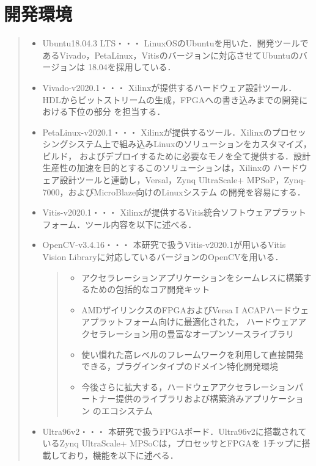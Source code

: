 \documentclass[11pt,a4j]{jreport}
\begin{document}
\section{開発環境}
\begin{quote}
  \begin{itemize}
    \item Ubuntu18.04.3 LTS・・・
    LinuxOSのUbuntuを用いた．開発ツールであるVivado，PetaLinux，Vitisのバージョンに対応させてUbuntuのバージョンは
    18.04を採用している．
    \item Vivado-v2020.1・・・
    Xilinxが提供するハードウェア設計ツール．HDLからビットストリームの生成，FPGAへの書き込みまでの開発における下位の部分
    を担当する．
    \item PetaLinux-v2020.1・・・
    Xilinxが提供するツール．Xilinxのプロセッシングシステム上で組み込みLinuxのソリューションをカスタマイズ，ビルド，
    およびデプロイするために必要なモノを全て提供する．設計生産性の加速を目的とするこのソリューションは，Xilinxの
    ハードウェア設計ツールと連動し，Versal，Zynq UltraScale+ MPSoP，Zynq-7000，およびMicroBlaze向けのLinuxシステム
    の開発を容易にする．
    \item Vitis-v2020.1・・・
    Xilinxが提供するVitis統合ソフトウェアプラットフォーム．ツール内容を以下に述べる．
    \item OpenCV-v3.4.16・・・
    本研究で扱うVitis-v2020.1が用いるVitis Vision Libraryに対応しているバージョンのOpenCVを用いる．
    \begin{quote}
      \begin{itemize}
        \item アクセラレーションアプリケーションをシームレスに構築するための包括的なコア開発キット
        \item AMDザイリンクスのFPGAおよびVersa I ACAPハードウェアプラットフォーム向けに最適化された，
        ハードウェアアクセラレーション用の豊富なオープンソースライブラリ
        \item 使い慣れた高レベルのフレームワークを利用して直接開発できる，プラグインタイプのドメイン特化開発環境
        \item 今後さらに拡大する，ハードウェアアクセラレーションパートナー提供のライブラリおよび構築済みアプリケーション
        のエコシステム
      \end{itemize}
    \end{quote}
    \item Ultra96v2・・・
    本研究で扱うFPGAボード．Ultra96v2に搭載されているZynq UltraScale+ MPSoCは，プロセッサとFPGAを
    1チップに搭載しており，機能を以下に述べる．

\end{itemize}
\end{quote}
\end{document}
